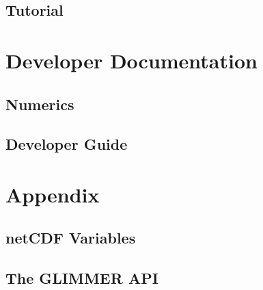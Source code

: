 \chapter{Tutorial}
\renewcommand{\dir}{tut}


\part{Developer Documentation}

\chapter{Numerics}
\renewcommand{\dir}{num}


\chapter{Developer Guide}
\renewcommand{\dir}{dg}


\renewcommand{\dir}{ext}


\part{Appendix}
\appendix
\renewcommand{\dir}{ug}
\chapter{netCDF Variables}

\chapter{The GLIMMER API}



\renewcommand{\dir}{ext}




